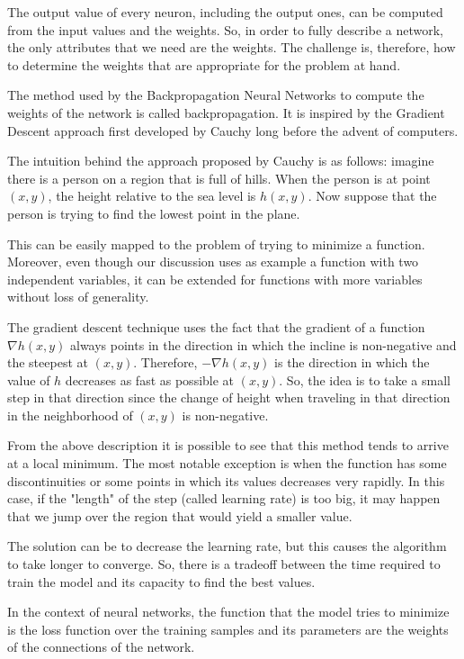 The output value of every neuron, including the output ones, can be computed from the input values and the weights.
So, in order to fully describe a network, the only attributes that we need are the weights.
The challenge is, therefore, how to determine the weights that are appropriate for the problem at hand.

The method used by the Backpropagation Neural Networks to compute the weights of the network is called backpropagation.
It is inspired by the Gradient Descent approach first developed by Cauchy \cite{lemarechal2012cauchy} long before the advent of computers.

The intuition behind the approach proposed by Cauchy is as follows: imagine there is a person on a region that is full of hills.
When the person is at point $(x, y)$, the height relative to the sea level is $h(x, y)$.
Now suppose that the person is trying to find the lowest point in the plane.

This can be easily mapped to the problem of trying to minimize a function.
Moreover, even though our discussion uses as example a function with two independent variables, it can be extended for functions with more variables without loss of generality.

The gradient descent technique uses the fact that the gradient of a function $\nabla h(x, y)$ always points in the direction in which the incline is non-negative and the steepest at $(x, y)$.
Therefore, $-\nabla h(x,y)$ is the direction in which the value of $h$ decreases as fast as possible at $(x, y)$.
So, the idea is to take a small step in that direction since the change of height when traveling in that direction in the neighborhood of $(x, y)$ is non-negative.

From the above description it is possible to see that this method tends to arrive at a local minimum.
The most notable exception is when the function has some discontinuities or some points in which its values decreases very rapidly.
In this case, if the "length" of the step (called learning rate) is too big, it may happen that we jump over the region that would yield a smaller value.

The solution can be to decrease the learning rate, but this causes the algorithm to take longer to converge.
So, there is a tradeoff between the time required to train the model and its capacity to find the best values.

In the context of neural networks, the function that the model tries to minimize is the loss function over the training samples and its parameters are the weights of the connections of the network.


